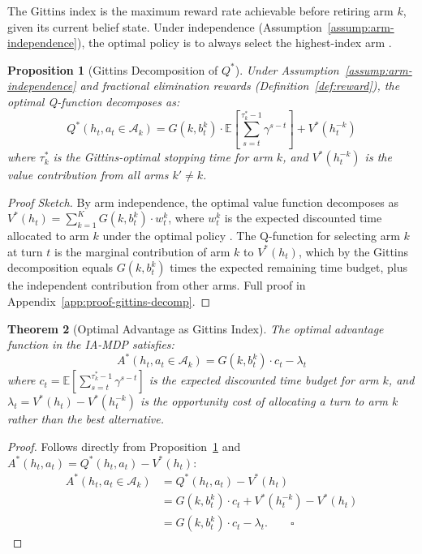 \documentclass[11pt]{article}
\theoremstyle{plain}
\newtheorem{theorem}{Theorem}[section]
\newtheorem{proposition}[theorem]{Proposition}
\theoremstyle{definition}
\theoremstyle{remark}
\begin{document}
The Gittins index is the maximum reward rate achievable before 
retiring arm $k$, given its current belief state. Under 
independence (Assumption~\ref{assump:arm-independence}), the 
optimal policy is to always select the highest-index arm 
\citep{gittins1979bandit, weber1992gittins}.

\begin{proposition}[Gittins Decomposition of $Q^*$]
\label{prop:gittins-decomp}
Under Assumption~\ref{assump:arm-independence} and fractional 
elimination rewards (Definition~\ref{def:reward}), the optimal 
Q-function decomposes as:
$$Q^*(h_t, a_t \in \mathcal{A}_k) = 
G(k, b_t^k) \cdot \mathbb{E}\!\left[\sum_{s=t}^{\tau_k^*-1} 
\gamma^{s-t}\right] + V^*(h_t^{-k})$$
where $\tau_k^*$ is the Gittins-optimal stopping time for arm 
$k$, and $V^*(h_t^{-k})$ is the value contribution from all 
arms $k' \neq k$.
\end{proposition}

\begin{proof}[Proof Sketch]
By arm independence, the optimal value function decomposes as 
$V^*(h_t) = \sum_{k=1}^K G(k, b_t^k) \cdot w_t^k$, where 
$w_t^k$ is the expected discounted time allocated to arm $k$ 
under the optimal policy \citep{weber1992gittins}. The 
Q-function for selecting arm $k$ at turn $t$ is the marginal 
contribution of arm $k$ to $V^*(h_t)$, which by the Gittins 
decomposition equals $G(k, b_t^k)$ times the expected remaining 
time budget, plus the independent contribution from other arms.
Full proof in Appendix~\ref{app:proof-gittins-decomp}.
\end{proof}

\begin{theorem}[Optimal Advantage as Gittins Index]
\label{thm:advantage-gittins}
The optimal advantage function in the IA-MDP satisfies:
$$A^*(h_t, a_t \in \mathcal{A}_k) = 
G(k, b_t^k) \cdot c_t - \lambda_t$$
where $c_t = \mathbb{E}[\sum_{s=t}^{\tau_k^*-1} \gamma^{s-t}]$ 
is the expected discounted time budget for arm $k$, and 
$\lambda_t = V^*(h_t) - V^*(h_t^{-k})$ is the \emph{opportunity 
cost} of allocating a turn to arm $k$ rather than the best 
alternative.
\end{theorem}

\begin{proof}
Follows directly from Proposition~\ref{prop:gittins-decomp} 
and $A^*(h_t, a_t) = Q^*(h_t, a_t) - V^*(h_t)$:
\begin{align*}
A^*(h_t, a_t \in \mathcal{A}_k) 
&= Q^*(h_t, a_t) - V^*(h_t) \\
&= G(k, b_t^k) \cdot c_t + V^*(h_t^{-k}) - V^*(h_t) \\
&= G(k, b_t^k) \cdot c_t - \lambda_t. \qquad \square
\end{align*}
\end{proof}
\end{document}
